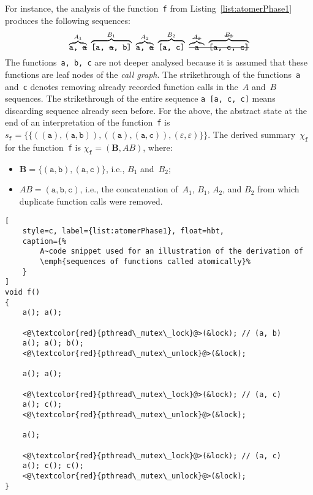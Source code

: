 \begin{example}
    For instance, the analysis of the function~\texttt{f} from
    Listing~\ref{list:atomerPhase1} produces the following sequences:
    $$
        \overbrace{\text{\texttt{a,~\sout{a}}}}^{A_1}~%
        \overbrace{\text{\texttt{[a,~\sout{a},~b]}}}^{B_1}~%
        \overbrace{\text{\texttt{a,~\sout{a}}}}^{A_2}~%
        \overbrace{\text{\texttt{[a,~c]}}}^{B_2}~%
        \text{\sout{\ensuremath{%
            \overbrace{\text{\texttt{a}}}^{\text{\sout{\ensuremath{A_3}}}}~%
            \overbrace{\text{\texttt{[a,~c,~c]}}}%
            ^{\text{\sout{\ensuremath{B_3}}}}%
        }}}
    $$
    The functions~\texttt{a, b, c} are not deeper analysed because it
    is assumed that these functions are leaf nodes of the \emph{call
    graph}. The strikethrough of the functions~\texttt{a} and~\texttt{c}
    denotes removing already recorded function calls in the~$ A $
    and~$ B $ sequences. The strikethrough of the entire sequence
    \texttt{a~[a,~c,~c]} means discarding sequence already seen before.
    For the above, the abstract state at the end of an interpretation
    of the function~\texttt{f} is $ s_\mathtt{f} = \{\{{((\mathtt{a}),
    (\mathtt{a, b}))}, {((\mathtt{a}), (\mathtt{a, c}))}, {(\varepsilon,
    \varepsilon)}\}\} $. The derived summary~$ \chi_\mathtt{f} $ for the
    function~\texttt{f} is $ \chi_\mathtt{f} = {(\boldsymbol{B}, AB)} $,
    where:
    \begin{itemize}
        \item
            $ \boldsymbol{B} = \{{(\mathtt{a, b})}, {(\mathtt{a, c})}\} $,
            i.e., $ B_1 $ and~$ B_2 $;

        \item
            $ AB = {(\mathtt{a, b, c})} $, i.e., the concatenation
            of~$ A_1 $, $ B_1 $, $ A_2 $, and $ B_2 $ from which
            duplicate function calls were removed.
    \end{itemize}
\end{example}

\begin{lstlisting}[
    style=c, label={list:atomerPhase1}, float=hbt,
    caption={%
        A~code snippet used for an illustration of the derivation of
        \emph{sequences of functions called atomically}%
    }
]
void f()
{
    a(); a();

    <@\textcolor{red}{pthread\_mutex\_lock}@>(&lock); // (a, b)
    a(); a(); b();
    <@\textcolor{red}{pthread\_mutex\_unlock}@>(&lock);

    a(); a();

    <@\textcolor{red}{pthread\_mutex\_lock}@>(&lock); // (a, c)
    a(); c();
    <@\textcolor{red}{pthread\_mutex\_unlock}@>(&lock);

    a();

    <@\textcolor{red}{pthread\_mutex\_lock}@>(&lock); // (a, c)
    a(); c(); c();
    <@\textcolor{red}{pthread\_mutex\_unlock}@>(&lock);
}
\end{lstlisting}

